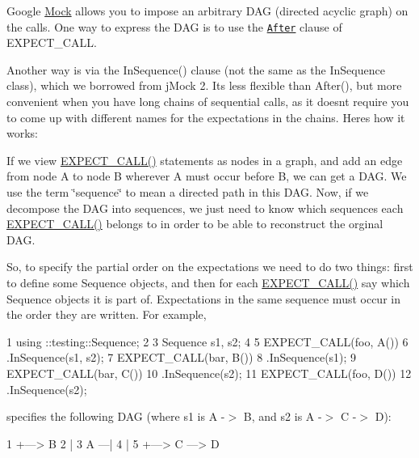 Google \hyperlink{class_mock}{Mock} allows you to impose an arbitrary D\+AG (directed acyclic graph) on the calls. One way to express the D\+AG is to use the \href{http://code.google.com/p/googlemock/wiki/V1_6_CheatSheet#The_After_Clause}{\tt After} clause of {\ttfamily E\+X\+P\+E\+C\+T\+\_\+\+C\+A\+LL}.

Another way is via the {\ttfamily In\+Sequence()} clause (not the same as the {\ttfamily In\+Sequence} class), which we borrowed from j\+Mock 2. It\textquotesingle{}s less flexible than {\ttfamily After()}, but more convenient when you have long chains of sequential calls, as it doesn\textquotesingle{}t require you to come up with different names for the expectations in the chains. Here\textquotesingle{}s how it works\+:

If we view {\ttfamily \hyperlink{gmock-spec-builders_8h_a535a6156de72c1a2e25a127e38ee5232}{E\+X\+P\+E\+C\+T\+\_\+\+C\+A\+L\+L()}} statements as nodes in a graph, and add an edge from node A to node B wherever A must occur before B, we can get a D\+AG. We use the term \char`\"{}sequence\char`\"{} to mean a directed path in this D\+AG. Now, if we decompose the D\+AG into sequences, we just need to know which sequences each {\ttfamily \hyperlink{gmock-spec-builders_8h_a535a6156de72c1a2e25a127e38ee5232}{E\+X\+P\+E\+C\+T\+\_\+\+C\+A\+L\+L()}} belongs to in order to be able to reconstruct the orginal D\+AG.

So, to specify the partial order on the expectations we need to do two things\+: first to define some {\ttfamily Sequence} objects, and then for each {\ttfamily \hyperlink{gmock-spec-builders_8h_a535a6156de72c1a2e25a127e38ee5232}{E\+X\+P\+E\+C\+T\+\_\+\+C\+A\+L\+L()}} say which {\ttfamily Sequence} objects it is part of. Expectations in the same sequence must occur in the order they are written. For example,


\begin{DoxyCode}
1 using ::testing::Sequence;
2 
3 Sequence s1, s2;
4 
5 EXPECT\_CALL(foo, A())
6     .InSequence(s1, s2);
7 EXPECT\_CALL(bar, B())
8     .InSequence(s1);
9 EXPECT\_CALL(bar, C())
10     .InSequence(s2);
11 EXPECT\_CALL(foo, D())
12     .InSequence(s2);
\end{DoxyCode}


specifies the following D\+AG (where {\ttfamily s1} is {\ttfamily A -\/$>$ B}, and {\ttfamily s2} is {\ttfamily A -\/$>$ C -\/$>$ D})\+:


\begin{DoxyCode}
1      +---> B
2      |
3 A ---|
4      |
5      +---> C ---> D
\end{DoxyCode}


